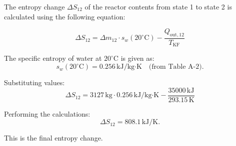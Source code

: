 The entropy change \( \Delta S_{12} \) of the reactor contents from state 1 to state 2 is calculated using the following equation:  

\[
\Delta S_{12} = \Delta m_{12} \cdot s_w(20^\circ\text{C}) - \frac{Q_{\text{out},12}}{T_{\text{KF}}}
\]

The specific entropy of water at \( 20^\circ\text{C} \) is given as:  
\[
s_w(20^\circ\text{C}) = 0.256 \, \text{kJ/kg·K} \quad \text{(from Table A-2)}.
\]

Substituting values:  
\[
\Delta S_{12} = 3127 \, \text{kg} \cdot 0.256 \, \text{kJ/kg·K} - \frac{35000 \, \text{kJ}}{293.15 \, \text{K}}
\]

Performing the calculations:  
\[
\Delta S_{12} = 808.1 \, \text{kJ/K}.
\]  

This is the final entropy change.